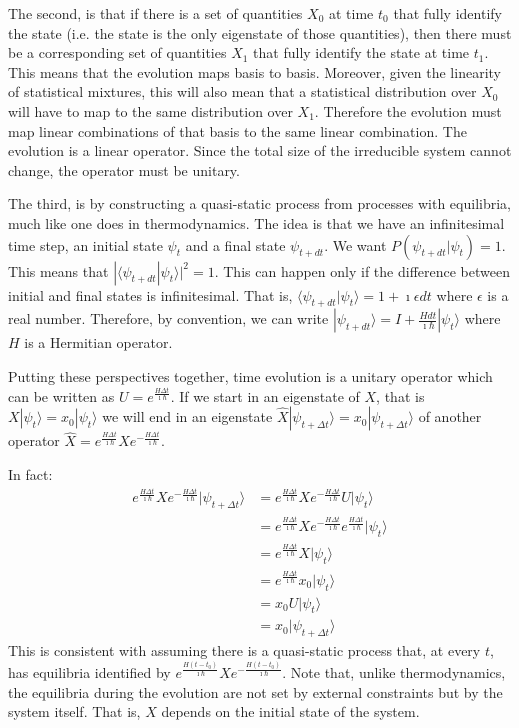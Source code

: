 \documentclass[11pt,letterpaper,fleqn]{memoir} %
\begin{document}
The second, is that if there is a set of quantities $X_0$ at time $t_0$ that fully identify the state (i.e. the state is the only eigenstate of those quantities), then there must be a corresponding set of quantities $X_1$ that fully identify the state at time $t_1$. This means that the evolution maps basis to basis. Moreover, given the linearity of statistical mixtures, this will also mean that a statistical distribution over $X_0$ will have to map to the same distribution over $X_1$. Therefore the evolution must map linear combinations of that basis to the same linear combination. The evolution is a linear operator. Since the total size of the irreducible system cannot change, the operator must be unitary.

The third, is by constructing a quasi-static process from processes with equilibria, much like one does in thermodynamics.  The idea is that we have an infinitesimal time step, an initial state $\psi_t$ and a final state $\psi_{t+dt}$. We want $P(\psi_{t+dt} | \psi_t ) = 1$. This means that $|\langle \psi_{t+dt} | \psi_{t} \rangle|^2 = 1$. This can happen only if the difference between initial and final states is infinitesimal. That is, $\langle \psi_{t+dt} | \psi_{t} \rangle = 1 + \imath \epsilon dt$ where $\epsilon$ is a real number. Therefore, by convention, we can write $| \psi_{t+dt} \rangle = I + \frac{H dt}{\imath \hbar} | \psi_{t} \rangle$ where $H$ is a Hermitian operator.

Putting these perspectives together, time evolution is a unitary operator which can be written as $U=e^{\frac{H\Delta t}{\imath \hbar}}$. If we start in an eigenstate of $X$, that is $X | \psi_t \rangle = x_0 | \psi_t \rangle$ we will end in an eigenstate $\hat{X} | \psi_{t + \Delta t} \rangle = x_0 | \psi_{t + \Delta t} \rangle$ of another operator $\hat{X} = e^{\frac{H\Delta t}{\imath \hbar}} X e^{- \frac{H\Delta t}{\imath \hbar}}$.

In fact:
\begin{equation}
\begin{aligned}
e^{\frac{H\Delta t}{\imath \hbar}} X e^{- \frac{H\Delta t}{\imath \hbar}}| \psi_{t + \Delta t} \rangle
&= e^{\frac{H\Delta t}{\imath \hbar}} X e^{- \frac{H\Delta t}{\imath \hbar}} U | \psi_t \rangle \\
&= e^{\frac{H\Delta t}{\imath \hbar}} X e^{- \frac{H\Delta t}{\imath \hbar}} e^{\frac{H\Delta t}{\imath \hbar}} | \psi_t \rangle \\
&= e^{\frac{H\Delta t}{\imath \hbar}} X  | \psi_t \rangle \\
&= e^{\frac{H\Delta t}{\imath \hbar}} x_0  | \psi_t \rangle \\
&= x_0 U | \psi_t \rangle \\
&= x_0 | \psi_{t + \Delta t} \rangle
\end{aligned}
\end{equation}
This is consistent with assuming there is a quasi-static process that, at every $t$, has equilibria identified by $e^{\frac{H (t - t_0)}{\imath \hbar}} X e^{- \frac{H (t - t_0)}{\imath \hbar}}$. Note that, unlike thermodynamics, the equilibria during the evolution are not set by external constraints but by the system itself. That is, $X$ depends on the initial state of the system.
\end{document}

